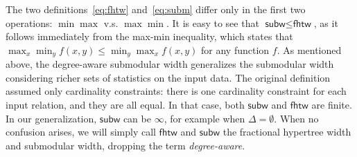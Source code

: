 \documentclass[10pt,a4paper]{article}
\newcommand{\fhtw}{\textsf{fhtw}}
\newcommand{\subm}{\textsf{subw}}
\begin{document}
The two definitions~\eqref{eq:fhtw} and~\eqref{eq:subm} differ only in the first two operations:
$\min \max$ v.s. $\max \min$.
It is easy to see that $\subm \leq \fhtw$, as it follows immediately from
the max-min inequality, which states that
$\max_x\min_y f(x, y) \leq \min_y\max_x f(x, y)$
for any function $f$.
As mentioned above, the degree-aware submodular width generalizes the submodular
width considering richer sets of statistics on the input data.  The original
definition assumed only cardinality constraints: there is one
cardinality constraint for each input relation, and they are all
equal.  In that case, both $\subm$ and $\fhtw$ are finite.  In our
generalization, $\subm$ can be $\infty$, for example when
$\Delta=\emptyset$.  When no confusion arises, we will simply call
$\fhtw$ and $\subm$ the fractional hypertree width and submodular width,
dropping the term {\em degree-aware}.
\end{document}
